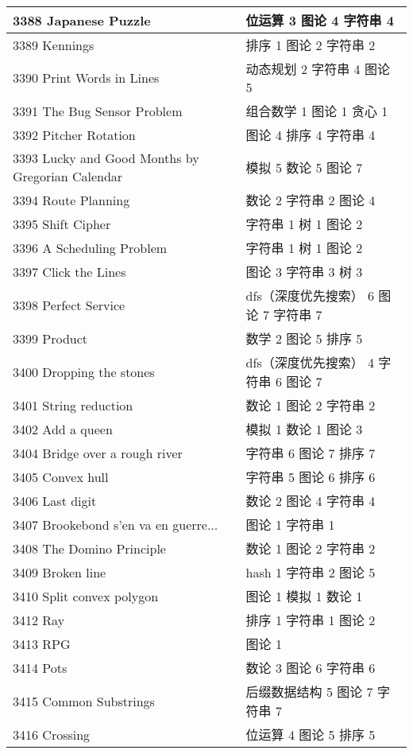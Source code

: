 \begin{longtable}{| p{} | p{} |}
 3388 Japanese Puzzle  & 位运算 3 图论 4 字符串 4 \\ \hline
 3389 Kennings  & 排序 1 图论 2 字符串 2 \\ \hline
 3390 Print Words in Lines  & 动态规划 2 字符串 4 图论 5 \\ \hline
 3391 The Bug Sensor Problem  & 组合数学 1 图论 1 贪心 1 \\ \hline
 3392 Pitcher Rotation  & 图论 4 排序 4 字符串 4 \\ \hline
 3393 Lucky and Good Months by Gregorian Calendar  & 模拟 5 数论 5 图论 7 \\ \hline
 3394 Route Planning  & 数论 2 字符串 2 图论 4 \\ \hline
 3395 Shift Cipher  & 字符串 1 树 1 图论 2 \\ \hline
 3396 A Scheduling Problem  & 字符串 1 树 1 图论 2 \\ \hline
 3397 Click the Lines  & 图论 3 字符串 3 树 3 \\ \hline
 3398 Perfect Service  & dfs（深度优先搜索） 6 图论 7 字符串 7 \\ \hline
 3399 Product  & 数学 2 图论 5 排序 5 \\ \hline
 3400 Dropping the stones  & dfs（深度优先搜索） 4 字符串 6 图论 7 \\ \hline
 3401 String reduction  & 数论 1 图论 2 字符串 2 \\ \hline
 3402 Add a queen  & 模拟 1 数论 1 图论 3 \\ \hline
 3404 Bridge over a rough river  & 字符串 6 图论 7 排序 7 \\ \hline
 3405 Convex hull  & 字符串 5 图论 6 排序 6 \\ \hline
 3406 Last digit  & 数论 2 图论 4 字符串 4 \\ \hline
 3407 Brookebond s'en va en guerre...  & 图论 1 字符串 1 \\ \hline
 3408 The Domino Principle  & 数论 1 图论 2 字符串 2 \\ \hline
 3409 Broken line  & hash 1 字符串 2 图论 5 \\ \hline
 3410 Split convex polygon  & 图论 1 模拟 1 数论 1 \\ \hline
 3412 Ray  & 排序 1 字符串 1 图论 2 \\ \hline
 3413 RPG  & 图论 1 \\ \hline
 3414 Pots  & 数论 3 图论 6 字符串 6 \\ \hline
 3415 Common Substrings  & 后缀数据结构 5 图论 7 字符串 7 \\ \hline
 3416 Crossing  & 位运算 4 图论 5 排序 5 \\ \hline

\end{longtable}

